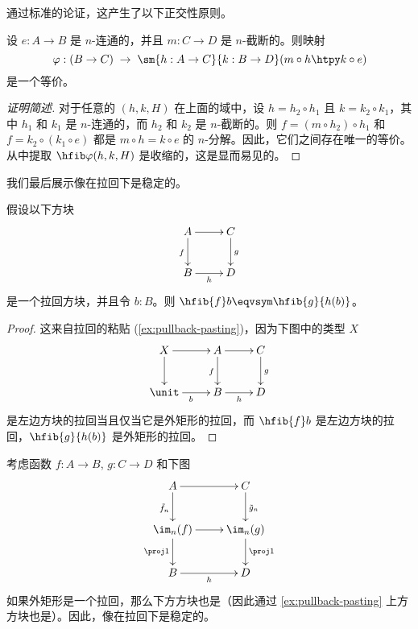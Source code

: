通过标准的论证，这产生了以下正交性原则。

\begin{thm}
    设 $e:A\to B$ 是 $n$-连通的，并且 $m:C\to D$ 是 $n$-截断的。则映射
    \[ \varphi: (B\to C) \;\to\; \sm{h:A\to C}{k:B\to D} (m\circ h \htpy k \circ e) \]
    是一个等价。
\end{thm}
\begin{proof}[证明简述]
    对于任意的 $(h,k,H)$ 在上面的域中，设 $h = h_2 \circ h_1$ 且 $k = k_2 \circ k_1$，其中 $h_1$ 和 $k_1$ 是 $n$-连通的，而 $h_2$ 和 $k_2$ 是 $n$-截断的。则 $f = (m\circ h_2) \circ h_1$ 和 $f = k_2 \circ (k_1\circ e)$ 都是 $m \circ h = k\circ e$ 的 $n$-分解。因此，它们之间存在唯一的等价。从中提取 $\hfib\varphi{(h,k,H)}$ 是收缩的，这是显而易见的。
\end{proof}

%
%

我们最后展示像在拉回下是稳定的。
%

\begin{lem}\label{lem:hfiber_wrt_pullback}
假设以下方块
\begin{equation*}
    \vcenter{\xymatrix{
        A\ar[r]\ar[d]_f &
        C\ar[d]^g\\
        B\ar[r]_-h &
        D
    }}
\end{equation*}
是一个拉回方块，并且令 $b:B$。则 $\hfib{f}b\eqvsym\hfib{g}{h(b)}$。
\end{lem}

\begin{proof}
    这来自拉回的粘贴 (\cref{ex:pullback-pasting})，因为下图中的类型 $X$
    \begin{equation*}
        \vcenter{\xymatrix{
            X\ar[r]\ar[d] &
            A\ar[r]\ar[d]_f &
            C\ar[d]^g\\
            \unit\ar[r]_b &
            B\ar[r]_h &
            D
        }}
    \end{equation*}
    是左边方块的拉回当且仅当它是外矩形的拉回，而 $\hfib{f}b$ 是左边方块的拉回，$\hfib{g}{h(b)}$ 是外矩形的拉回。
\end{proof}

\begin{thm}\label{thm:stable-images}
%
考虑函数 $f:A\to B$, $g:C\to D$ 和下图
\begin{equation*}
    \vcenter{\xymatrix{
        A\ar[r]\ar[d]_{\tilde{f}_n} &
        C\ar[d]^{\tilde{g}_n}\\
        \im_n(f)\ar[r]\ar[d]_{\proj1} &
        \im_n(g)\ar[d]^{\proj1}\\
        B\ar[r]_h &
        D
    }}
\end{equation*}
如果外矩形是一个拉回，那么下方方块也是（因此通过 \cref{ex:pullback-pasting} 上方方块也是）。因此，像在拉回下是稳定的。
\end{thm}

